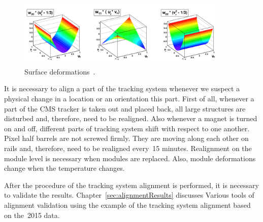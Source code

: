 \begin{figure}[htb]
    \begin{center}
        \includegraphics[width=0.90\textwidth]{../figs/Alignment/alignment_surface_deformations.png}
    \end{center}
    \caption{Surface deformations~\cite{ref_Alignment}.}
    \label{fig:surfaceDeformations}
\end{figure}

It is necessary to align a part of the tracking system whenever we suspect a physical change in a location or an orientation this part. First of all, whenever a part of the CMS tracker is taken out and placed back, all large structures are disturbed and, therefore, need to be realigned. Also whenever a magnet is turned on and off, different parts of tracking system shift with respect to one another. Pixel half barrels are not screwed firmly. They are moving along each other on rails and, therefore, need to be realigned every~15 minutes. Realignment on the module level is necessary when modules are replaced. Also, module deformations change when the temperature changes. 

After the procedure of the tracking system alignment is performed, it is necessary to validate the results. Chapter~\ref{sec:alignmentResults} discusses Various tools of alignment validation using the example of the tracking system alignment based on the~2015 data.   


